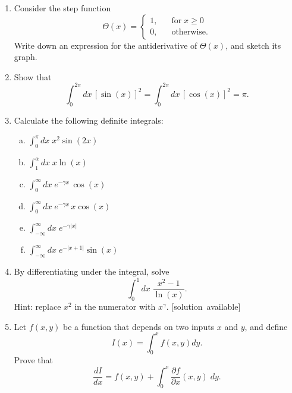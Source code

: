 \documentclass[10pt,a4paper]{article}
\begin{document}
\begin{enumerate}
\item
  Consider the step function
  \begin{equation}
    \Theta(x) = \left\{\begin{array}{ll} 1, &\;\;\;\textrm{for} \; x \ge 0\\ 0,&\;\;\; \textrm{otherwise.}\end{array}\right.
  \end{equation}
  Write down an expression for the antiderivative of $\Theta(x)$, and
  sketch its graph.

\item
  Show that
  \begin{equation}
    \int_0^{2\pi} dx\, [\sin(x)]^2 = \int_0^{2\pi} dx\, [\cos(x)]^2 = \pi.
  \end{equation}

\item
  Calculate the following definite integrals:

  \begin{enumerate}[(a)]
  \item $\displaystyle\int_{0}^\pi dx\; x^2 \sin(2x)$
  \item $\displaystyle\int_{1}^\alpha dx\; x \ln(x)$
  \item $\displaystyle\int_0^\infty dx\;e^{-\gamma x} \, \cos(x)$
  \item $\displaystyle\int_0^\infty dx\;e^{-\gamma x} \, x \cos(x)$
  \item $\displaystyle\int_{-\infty}^\infty dx\;e^{-\gamma |x|}$
  \item $\displaystyle \int_{-\infty}^\infty dx \;e^{-|x+1|} \sin(x)$
  \end{enumerate}

\item
  By differentiating under the integral, solve
  \begin{equation}
    \int_0^1 dx\; \frac{x^2-1}{\ln(x)}.
  \end{equation}
  Hint: replace $x^2$ in the numerator with $x^\gamma$.
  \hfill{\scriptsize [solution~available]}

\item
  Let $f(x,y)$ be a function that depends on two inputs $x$ and
  $y$, and define
  \begin{equation}
    I(x) = \int_0^x f(x,y) dy.
  \end{equation}
  Prove that
  \begin{equation}
    \frac{dI}{dx} = f(x,y) + \int_0^x \frac{\partial f}{\partial x}(x,y) \;dy.
  \end{equation}


\end{enumerate}
\end{document}
